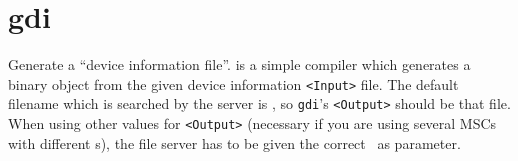 \section{gdi}
\begin{man}
  \PP Generate a ``device information file''.
   is a simple compiler which generates a binary object from the
             given device information {\tt <Input>} file. The default filename which
             is searched by the server is \HEDI, so {\tt gdi}'s
             {\tt <Output>} should be that file. When using other values for
             {\tt <Output>} (necessary if you are using several MSCs with different
             \DI s), the file server has to be given the correct \DI\ as
             parameter.
\end{man}

